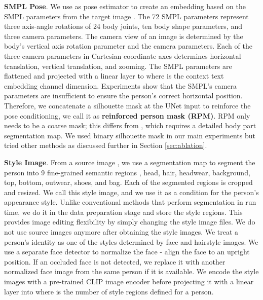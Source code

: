 \documentclass[10pt,twocolumn,letterpaper]{article}
\begin{document}
\noindent\textbf{SMPL Pose}. We use \cite{phosa} as pose estimator  to create an embedding based on the SMPL parameters from the target image . The  72 SMPL parameters represent three axis-angle rotations of 24 body joints, ten body shape parameters, and three camera parameters. The camera view of an image is determined by the body's vertical axis rotation parameter and the camera parameters. Each of the three camera parameters in Cartesian coordinate axes determines horizontal translation, vertical translation, and zooming. The SMPL parameters are flattened and projected with a linear layer to  where  is the context text embedding channel dimension. Experiments show that the SMPL's camera parameters are insufficient to ensure the person's correct horizontal position. Therefore, we concatenate a silhouette mask  at the UNet input to reinforce the pose conditioning, we call it as \textbf{reinforced person mask (RPM)}. RPM only needs to be a coarse mask; this differs from \cite{adgan, pise,spgnet,casd}, which requires a detailed body part segmentation map. We used binary silhouette mask in our main experiments but tried other methods as discussed further in Section \ref{sec:ablation}. 

\noindent\textbf{Style Image}. From a source image , we use a segmentation map to segment the person into 9 fine-grained semantic regions \ie, head, hair, headwear, background, top, bottom, outwear, shoes, and bag. Each of the segmented regions is cropped and resized. We call this style image, and we use it as a condition for the person's appearance style. Unlike conventional methods that perform segmentation in run time, we do it in the data preparation stage and store the style regions. This provides image editing flexibility by simply changing the style image files. We do not use source images anymore after obtaining the style images. We treat a person's identity as one of the styles determined by face and hairstyle images. We use a separate face detector to normalize the face - align the face to an upright position. If an occluded face is not detected, we replace it with another normalized face image from the same person if it is available. We encode the style images with a pre-trained CLIP \cite{clip} image encoder  before projecting it with a linear layer into   where  is the number of style regions defined for a person.
\end{document}
